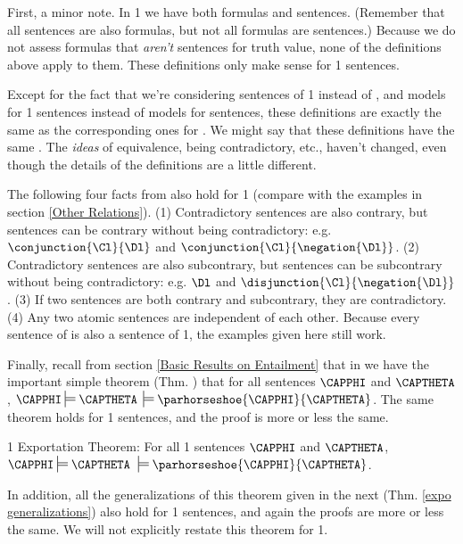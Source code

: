 First, a minor note.
In \GQL{}1 we have both formulas and sentences. 
(Remember that all sentences are also formulas, but not all formulas are sentences.) 
Because we do not assess formulas that \emph{aren't} sentences for truth value, none of the definitions above apply to them. 
These definitions only make sense for \GQL{}1 sentences. 

Except for the fact that we're considering sentences of \GQL{}1 instead of \GSL{}, and models for \GQL{}1 sentences instead of models for \GSL{} sentences, these definitions are exactly the same as the corresponding ones for \GSL{}. 
We might say that these definitions have the same . 
The \emph{ideas} of equivalence, being contradictory, etc., haven't changed, even though the details of the definitions are a little different.

The following four facts from \GSL{} also hold for \GQL{}1 (compare with the examples in section \ref{Other Relations}).
(1) Contradictory sentences are also contrary, but sentences can be contrary without being contradictory: e.g. $\conjunction{\Cl}{\Dl}$ and $\conjunction{\Cl}{\negation{\Dl}}$.
(2) Contradictory sentences are also subcontrary, but sentences can be subcontrary without being contradictory: e.g. $\Dl$ and $\disjunction{\Cl}{\negation{\Dl}}$.
(3) If two sentences are both contrary and subcontrary, they are contradictory.
(4) Any two atomic sentences are independent of each other.
Because every sentence of \GSL{} is also a sentence of \GQL{}1, the examples given here still work. 

Finally, recall from section \ref{Basic Results on Entailment} that in \GSL{} we have the important simple theorem (Thm. ) that for all \GSL{} sentences $\CAPPHI$ and $\CAPTHETA$, $\CAPPHI\sdtstile{}{}\CAPTHETA$ \Iff $\sdtstile{}{}\parhorseshoe{\CAPPHI}{\CAPTHETA}$. 
The same theorem holds for \GQL{}1 sentences, and the proof is more or less the same. 
\begin{THEOREM}{ \GQL{}1 Exportation Theorem:} For all \GQL{}1 sentences $\CAPPHI$ and $\CAPTHETA$, $\CAPPHI\sdtstile{}{}\CAPTHETA$ \Iff $\:\sdtstile{}{}\parhorseshoe{\CAPPHI}{\CAPTHETA}$.
\end{THEOREM}
\noindent{}In addition, all the generalizations of this theorem given in the next (Thm. \ref{expo generalizations}) also hold for \GQL{}1 sentences, and again the proofs are more or less the same. We will not explicitly restate this theorem for \GQL{}1.


